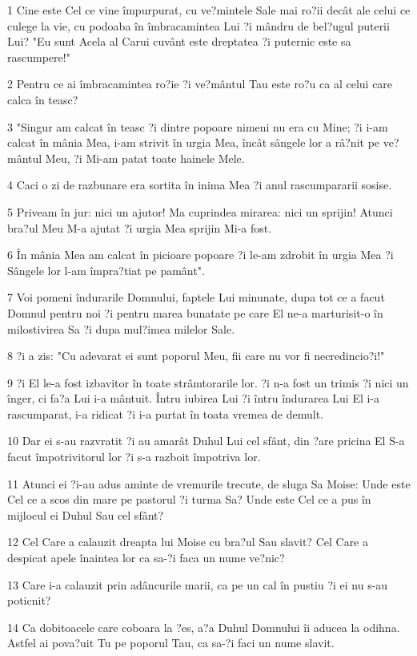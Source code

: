 \par 1 Cine este Cel ce vine împurpurat, cu ve?mintele Sale mai ro?ii decât ale celui ce culege la vie, cu podoaba în îmbracamintea Lui ?i mândru de bel?ugul puterii Lui? "Eu sunt Acela al Carui cuvânt este dreptatea ?i puternic este sa rascumpere!"
\par 2 Pentru ce ai îmbracamintea ro?ie ?i ve?mântul Tau este ro?u ca al celui care calca în teasc?
\par 3 "Singur am calcat în teasc ?i dintre popoare nimeni nu era cu Mine; ?i i-am calcat în mânia Mea, i-am strivit în urgia Mea, încât sângele lor a râ?nit pe ve?mântul Meu, ?i Mi-am patat toate hainele Mele.
\par 4 Caci o zi de razbunare era sortita în inima Mea ?i anul rascumpararii sosise.
\par 5 Priveam în jur: nici un ajutor! Ma cuprindea mirarea: nici un sprijin! Atunci bra?ul Meu M-a ajutat ?i urgia Mea sprijin Mi-a fost.
\par 6 În mânia Mea am calcat în picioare popoare ?i le-am zdrobit în urgia Mea ?i Sângele lor l-am împra?tiat pe pamânt".
\par 7 Voi pomeni îndurarile Domnului, faptele Lui minunate, dupa tot ce a facut Domnul pentru noi ?i pentru marea bunatate pe care El ne-a marturisit-o în milostivirea Sa ?i dupa mul?imea milelor Sale.
\par 8 ?i a zis: "Cu adevarat ei sunt poporul Meu, fii care nu vor fi necredincio?i!"
\par 9 ?i El le-a fost izbavitor în toate strâmtorarile lor. ?i n-a fost un trimis ?i nici un înger, ci fa?a Lui i-a mântuit. Întru iubirea Lui ?i întru îndurarea Lui El i-a rascumparat, i-a ridicat ?i i-a purtat în toata vremea de demult.
\par 10 Dar ei s-au razvratit ?i au amarât Duhul Lui cel sfânt, din ?are pricina El S-a facut împotrivitorul lor ?i s-a razboit împotriva lor.
\par 11 Atunci ei ?i-au adus aminte de vremurile trecute, de sluga Sa Moise: Unde este Cel ce a scos din mare pe pastorul ?i turma Sa? Unde este Cel ce a pus în mijlocul ei Duhul Sau cel sfânt?
\par 12 Cel Care a calauzit dreapta lui Moise cu bra?ul Sau slavit? Cel Care a despicat apele înaintea lor ca sa-?i faca un nume ve?nic?
\par 13 Care i-a calauzit prin adâncurile marii, ca pe un cal în pustiu ?i ei nu s-au poticnit?
\par 14 Ca dobitoacele care coboara la ?es, a?a Duhul Domnului îi aducea la odihna. Astfel ai pova?uit Tu pe poporul Tau, ca sa-?i faci un nume slavit.
